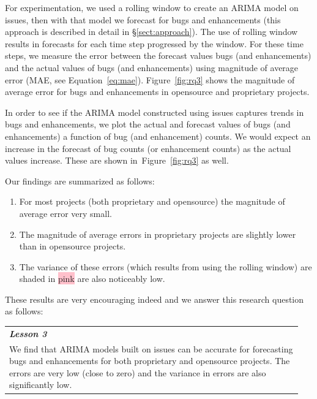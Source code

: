\documentclass[sigconf, preprint]{acmart}
\newcommand{\be}{\begin{enumerate}}
\newcommand{\ee}{\end{enumerate}}
\newcommand{\tion}[1]{\S\ref{sect:#1}}
\newcommand{\fig}[1]{Figure~\ref{fig:#1}}
\newcommand{\eq}[1]{Equation~\ref{eq:#1}}
\begin{document}
For experimentation, we used a rolling window to create an ARIMA model on 
issues, then with that model we forecast for 
bugs and enhancements (this approach is described in detail in 
\tion{approach}). The use of rolling window results in forecasts for each time 
step progressed by the window. For these time steps, we measure the error 
between the forecast values bugs (and enhancements) and the actual values of 
bugs (and enhancements) using magnitude of average error (MAE, see \eq{mae}).
\fig{rq3} shows the magnitude of average error for bugs and 
enhancements in opensource and proprietary projects.

In order to see if the ARIMA model constructed using issues captures trends in 
bugs and enhancements, we plot the actual and 
forecast values of bugs (and enhancements) a function of bug (and 
enhancement) counts. We would expect an increase in the forecast of bug counts 
(or enhancement counts) as the actual values increase. These are shown 
in~\fig{rq3} as well.

Our findings are summarized as follows: 
\be
\item For most projects (both proprietary and opensource) the magnitude of 
average error very small. 
\item The magnitude of average errors in proprietary projects are slightly 
lower than in opensource projects.
\item The variance of these errors (which results from using the rolling 
window) are shaded in \colorbox{pink}{pink} are also noticeably low.
\ee
\noindent These results are very encouraging indeed and we answer this research 
question as follows:\\[0.1cm]
\noindent\begin{minipage}{\linewidth}
	\begin{center}
		\begin{tabular}{p{0.95\linewidth}}
			\arrayrulecolor{Gray}
			\hline
			\rowcolor{Gray}
			\textbf{\textit{Lesson 3}}\bigstrut\\
			\rowcolor{Gray} We find that ARIMA models built 
			on issues can be accurate for forecasting bugs and 
			enhancements for both proprietary and opensource projects. The errors 
			are very low (close to zero) 
			and the variance in errors are also significantly low.\\\hline
		\end{tabular}
	\end{center}
\end{minipage}\bigstrut[t]\\[-0.3cm]
\end{document}
